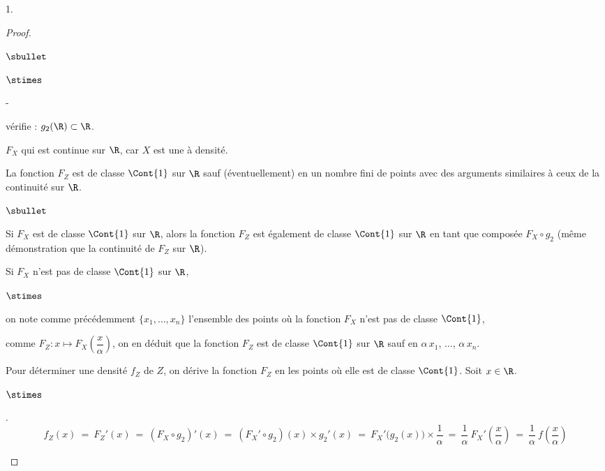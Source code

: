 \documentclass[11pt]{article}%
\begin{document}
\begin{noliste}{1.}
\begin{proof}
\begin{noliste}{$\sbullet$}
\begin{noliste}{$\stimes$}
\begin{noliste}{-}
        \item vérifie : $g_2(\R) \subset \R$.
        \end{noliste}
        
      \item $F_X$ qui est continue sur $\R$, car $X$ est une \var à densité.
      \end{noliste}
      
    \item La fonction $F_Z$ est de classe $\Cont{1}$ sur $\R$ sauf
      (éventuellement) en un nombre fini de points avec des arguments
      similaires à ceux de la continuité sur $\R$.
      \begin{remark}
        \begin{noliste}{$\sbullet$}
        \item Si $F_X$ est de classe $\Cont{1}$ sur $\R$, alors la
          fonction $F_Z$ est également de classe $\Cont{1}$ sur $\R$
          en tant que composée $F_X \circ g_2$ (même démonstration que
          la continuité de $F_Z$ sur $\R$).
          
        \item Si $F_X$ n'est pas de classe $\Cont{1}$ sur $\R$,
          \begin{noliste}{$\stimes$}
          \item on note comme précédemment $\{x_1, \ldots, x_n\}$ l'ensemble
            des points où la fonction $F_X$ n'est pas de classe $\Cont{1}$,
            
          \item comme $F_Z : x \mapsto F_X \left( \dfrac{x}{\alpha}
            \right)$, on en déduit que la fonction $F_Z$ est de classe
            $\Cont{1}$ sur $\R$ sauf en $\alpha \, x_1$, $\ldots$,
            $\alpha \, x_n$.
          \end{noliste}
        \end{noliste}
      \end{remark}

    \item Pour déterminer une densité $f_Z$ de $Z$, on dérive la
      fonction $F_Z$ en les points où elle est de classe
      $\Cont{1}$. Soit $x \in \R$.
      \begin{noliste}{$\stimes$}
      \item {}.
        \[
          f_Z(x) \ = \ F_Z'(x) \ = \ (F_X \circ g_2)'(x) \ = \ (F_X'
          \circ g_2)(x) \times g_2'(x) \ = \ F_X'\big(g_2(x)\big)
          \times \dfrac{1}{\alpha} \ = \ \dfrac{1}{\alpha} \
          F_X'\left( \dfrac{x}{\alpha} \right) \ = \ \dfrac{1}{\alpha}
          \ f\left( \dfrac{x}{\alpha} \right)
        \]
        

\end{noliste}
\end{noliste}
\end{proof}
\end{noliste}
\end{document}
